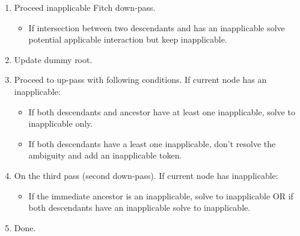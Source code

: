 \documentclass[a4paper,12pt]{article}
\begin{document}
\begin{enumerate}

\item Proceed inapplicable Fitch down-pass.
    \begin{itemize}
        \item If intersection between two descendants and has an inapplicable solve potential applicable interaction but keep inapplicable.

    \end{itemize}

\item Update dummy root.

\item Proceed to up-pass with following conditions. If current node has an inapplicable:
    \begin{itemize}
        \item If both descendants and ancestor have at least one inapplicable, solve to inapplicable only.
        \item If both descendants have a least one inapplicable, don't resolve the ambiguity and add an inapplicable token.
    \end{itemize}

\item On the third pass (second down-pass). If current node has inapplicable:
    \begin{itemize}
        \item If the immediate ancestor is an inapplicable, solve to inapplicable OR if both descendants have an inapplicable solve to inapplicable.
    \end{itemize}

\item Done.

\end{enumerate}
\end{document}
